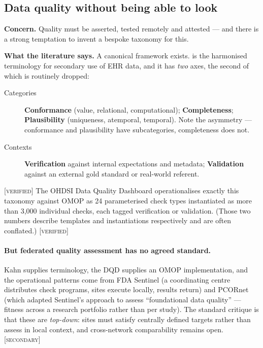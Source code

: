 \documentclass[11pt,a4paper]{article}
\newcommand{\verified}{\textsc{[verified]}}
\newcommand{\secondary}{\textsc{[secondary]}}
\newcommand{\concern}[1]{\par\medskip\noindent\textbf{Concern.} #1}
\newcommand{\evidence}[1]{\par\smallskip\noindent\textbf{What the literature says.} #1}
\begin{document}
\subsection{Data quality without being able to look}
\label{sec:quality}

\concern{Quality must be asserted, tested remotely and attested --- and
there is a strong temptation to invent a bespoke taxonomy for this.}

\evidence{A canonical framework exists. \citet{kahn2016harmonized} is the
harmonised terminology for secondary use of EHR data, and it has
\emph{two} axes, the second of which is routinely dropped:

\begin{description}
  \item[Categories] \textbf{Conformance} (value, relational,
  computational); \textbf{Completeness}; \textbf{Plausibility} (uniqueness,
  atemporal, temporal). Note the asymmetry --- conformance and plausibility
  have subcategories, completeness does not.
  \item[Contexts] \textbf{Verification} against internal expectations and
  metadata; \textbf{Validation} against an external gold standard or
  real-world referent.
\end{description}

\verified{} The OHDSI Data Quality Dashboard
\citep{blacketer2021increasing, ohdsi_dqd} operationalises exactly this
taxonomy against OMOP as 24 parameterised check types instantiated as more
than 3,000 individual checks, each tagged verification or validation. (Those
two numbers describe templates and instantiations respectively and are often
conflated.) \verified}

\paragraph{But federated quality assessment has no agreed standard.} Kahn
supplies terminology, the DQD supplies an OMOP implementation, and the
operational patterns come from FDA Sentinel (a coordinating centre
distributes check programs, sites execute locally, results return) and
PCORnet (which adapted Sentinel's approach to assess ``foundational data
quality'' --- fitness across a research portfolio rather than per study).
The standard critique is that these are \emph{top-down}: sites must satisfy
centrally defined targets rather than assess in local context, and
cross-network comparability remains open. \secondary
\end{document}

